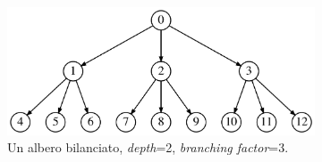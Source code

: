 \begin{figure}[t!]
    \centering
    \begin{subfigure}[b]{0.4\textwidth}
        \includegraphics[width=\textwidth]{./sezione3/experimental_results/plots/tree_graph.png}
        \caption{Un albero bilanciato, \emph{depth}=2, \emph{branching factor}=3.}
        \label{fig:balanced_tree}
    \end{subfigure}
    \qquad
    \begin{subfigure}[b]{0.1\textwidth}
        \centering

\end{subfigure}
\end{figure}
